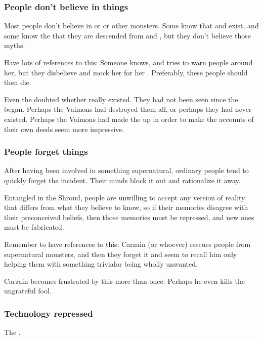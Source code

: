 \subsubsection{People don't believe in things}
Most people don't believe in \dragons{} or \banes{} or other monsters. Some know that \resphain{} and \rachyth{} exist, and some know the  that they are descended from \dragons{} and \banes, but they don't believe those myths. 

Have lots of references to this: 
Someone knows, and tries to warn people around her, but they disbelieve and mock her for her . 
Preferably, these people should then die. 

Even the \rethyaxes doubted whether \dragons really existed.
They had not been seen since the  began.
Perhaps the Vaimons had destroyed them all, or perhaps they had never existed.
Perhaps the Vaimons had made the \dragons up in order to make the accounts of their own deeds seem more impressive.





\subsubsection{People forget things}
After having been involved in something supernatural, ordinary people tend to quickly forget the incident. Their minds block it out and rationalize it away. 

Entangled in the Shroud, people are unwilling to accept any version of reality that differs from what they believe to know, so if their memories disagree with their preconceived beliefs, then those memories must be repressed, and new ones must be fabricated.

Remember to have references to this: Carzain (or whoever) rescues people from supernatural monsters, and then they forget it and seem to recall him only helping them with something trivial\dash or being wholly unwanted. 

Carzain becomes frustrated by this more than once. Perhaps he even kills the ungrateful fool.







\subsubsection{Technology repressed}
The . 







